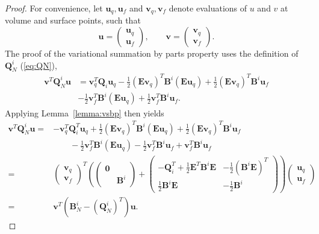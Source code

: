 \documentclass[review]{siamart0216}
\theoremstyle{assumption}
\newcommand{\LRp}[1]{\left( #1 \right)}
\begin{document}
\begin{proof}
For convenience, let $\bm{u}_q, \bm{u}_f$ and $\bm{v}_q, \bm{v}_f$ denote evaluations of $u$ and $v$ at volume and surface points, such that 
\[
\bm{u} = \begin{pmatrix} \bm{u}_q\\ \bm{u}_f\end{pmatrix}, \qquad \bm{v} = \begin{pmatrix} \bm{v}_q\\ \bm{v}_f\end{pmatrix}.  
\]
The proof of the variational summation by parts property uses the definition of $\bm{Q}^i_N$ (\ref{eq:QN}), 
\begin{align*}
\bm{v}^T\bm{Q}^i_N\bm{u} &= \bm{v}_q^T\bm{Q}_i \bm{u}_q - \frac{1}{2}\LRp{\bm{E}\bm{v}_q}^T\bm{B}^i \LRp{\bm{E}\bm{u}_q} + \frac{1}{2}\LRp{\bm{E}\bm{v}_q}^T\bm{B}^i \bm{u}_f\\
& - \frac{1}{2}\bm{v}_f^T\bm{B}^i \LRp{\bm{E}\bm{u}_q} + \frac{1}{2}\bm{v}_f^T\bm{B}^i \bm{u}_f.
\end{align*}
Applying Lemma~\ref{lemma:vsbp} then yields
\begin{align*}
\bm{v}^T\bm{Q}^i_N\bm{u} =& -\bm{v}_q^T\bm{Q}^T_i \bm{u}_q + \frac{1}{2}\LRp{\bm{E}\bm{v}_q}^T\bm{B}^i \LRp{\bm{E}\bm{u}_q} + \frac{1}{2}\LRp{\bm{E}\bm{v}_q}^T\bm{B}^i \bm{u}_f\\
&\qquad - \frac{1}{2}\bm{v}_f^T\bm{B}^i \LRp{\bm{E}\bm{u}_q} - \frac{1}{2}\bm{v}_f^T\bm{B}^i \bm{u}_f + \bm{v}_f^T\bm{B}^i \bm{u}_f\\
=& \begin{pmatrix} \bm{v}_q\\ \bm{v}_f\end{pmatrix}^T 
\left(\begin{pmatrix}
\bm{0}& \\
& \bm{B}^i
\end{pmatrix}\right.+
\left.\begin{pmatrix}
-\bm{Q}_i^T + \frac{1}{2}{\bm{E}}^T\bm{B}^i \bm{E} & -\frac{1}{2} \LRp{\bm{B}^i \bm{E}}^T\\
\frac{1}{2}\bm{B}^i \bm{E} & -\frac{1}{2}\bm{B}^i
\end{pmatrix}  \right)
\begin{pmatrix} \bm{u}_q\\ \bm{u}_f\end{pmatrix}\\
=& \bm{v}^T\LRp{\bm{B}^i_N - \LRp{\bm{Q}^i_N}^T}\bm{u}.
\end{align*}
\end{proof}
\end{document}
